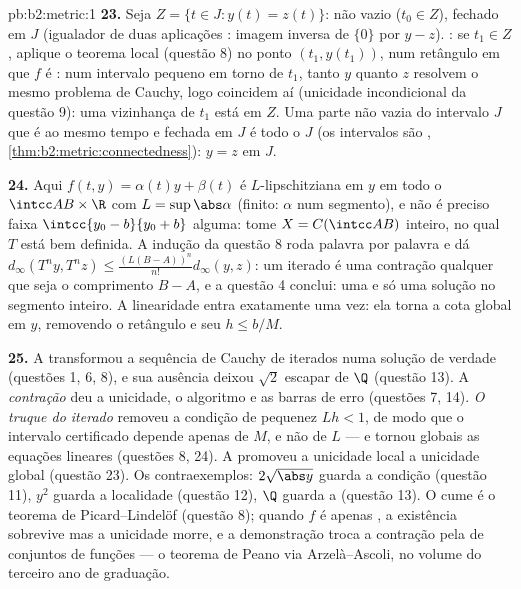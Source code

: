 \begin{solution}{pb:b2:metric:1}
\textbf{23.} Seja $Z = \{t \in J : y(t) = z(t)\}$: não vazio
($t_0 \in Z$), fechado em $J$ (igualador de duas aplicações :
imagem inversa de $\{0\}$ por $y - z$). : se $t_1 \in Z$, aplique
o teorema local (questão 8) no ponto $(t_1, y(t_1))$,
num retângulo em que $f$ é : num intervalo pequeno
em torno de $t_1$, tanto $y$ quanto $z$ resolvem o mesmo problema de Cauchy, logo
coincidem aí (unicidade incondicional da questão 9):
uma vizinhança de $t_1$ está em $Z$. Uma parte não vazia do
intervalo $J$ que é ao mesmo tempo  e fechada em $J$ é todo o $J$
(os intervalos são ,
\cref{thm:b2:metric:connectedness}): $y = z$ em $J$.

\textbf{24.} Aqui $f(t, y) = \alpha(t)y + \beta(t)$ é
$L$-lipschitziana em $y$ em todo o $\intcc AB \times \R$ com $L =
\sup\abs\alpha$ (finito: $\alpha$  num segmento), e
não é preciso faixa $\intcc{y_0 - b}{y_0 + b}$ alguma: tome $X = C(\intcc
AB)$ inteiro, no qual $T$ está bem definida. A indução da
questão 8 roda palavra por palavra e dá $d_\infty(T^ny, T^nz) \leq
\frac{(L(B - A))^n}{n!}d_\infty(y, z)$: um iterado é uma
contração qualquer que seja o comprimento $B - A$, e a questão 4
conclui: uma e só uma solução no segmento inteiro.
A linearidade entra exatamente uma vez: ela torna a cota 
global em $y$, removendo o retângulo e seu $h \leq b/M$.

\textbf{25.} A \emph{} transformou a sequência de Cauchy de
iterados numa solução de verdade (questões 1, 6, 8), e sua
ausência deixou $\sqrt2$ escapar de $\Q$ (questão 13).
A \emph{contração} deu a unicidade, o algoritmo e as
barras de erro (questões 7, 14). \emph{O truque do iterado} removeu
a condição de pequenez $Lh < 1$, de modo que o intervalo certificado
depende apenas de $M$, e não de $L$ --- e tornou globais as equações
lineares (questões 8, 24). A \emph{} promoveu a unicidade
local a unicidade global (questão 23). Os
contraexemplos: $2\sqrt{\abs y}$ guarda a condição  (questão
11), $y^2$ guarda a localidade (questão 12), $\Q$ guarda a
 (questão 13). O cume é o
teorema de Picard--Lindelöf (questão 8); quando $f$ é apenas
, a existência sobrevive mas a unicidade morre, e a
demonstração troca a contração pela  de conjuntos de funções
--- o teorema de Peano via Arzelà--Ascoli, no volume do terceiro ano de
graduação.
\end{solution}
